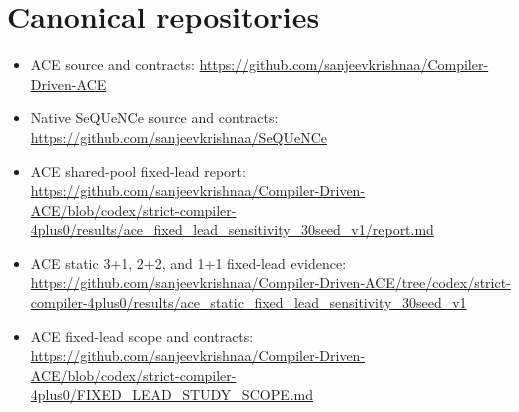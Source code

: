 \documentclass[11pt,a4paper]{report}
\begin{document}
\section{Canonical repositories}
\begin{itemize}
\item ACE source and contracts: \url{https://github.com/sanjeevkrishnaa/Compiler-Driven-ACE}
\item Native SeQUeNCe source and contracts: \url{https://github.com/sanjeevkrishnaa/SeQUeNCe}
\item ACE shared-pool fixed-lead report:
\url{https://github.com/sanjeevkrishnaa/Compiler-Driven-ACE/blob/codex/strict-compiler-4plus0/results/ace_fixed_lead_sensitivity_30seed_v1/report.md}
\item ACE static 3+1, 2+2, and 1+1 fixed-lead evidence:
\url{https://github.com/sanjeevkrishnaa/Compiler-Driven-ACE/tree/codex/strict-compiler-4plus0/results/ace_static_fixed_lead_sensitivity_30seed_v1}
\item ACE fixed-lead scope and contracts:
\url{https://github.com/sanjeevkrishnaa/Compiler-Driven-ACE/blob/codex/strict-compiler-4plus0/FIXED_LEAD_STUDY_SCOPE.md}
\end{itemize}
\end{document}
